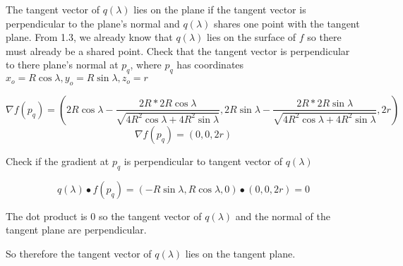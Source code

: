 \documentclass[a4paper,10pt]{scrartcl}
\begin{document}
The tangent vector of $q(\lambda)$ lies on the plane if the tangent vector is perpendicular to the plane's
normal and $q(\lambda)$ shares one point with the tangent plane. From 1.3, we already know that $q(\lambda)$ lies on
the surface of $f$ so there must already be a shared point. Check that the tangent vector is perpendicular to there
plane's normal at $p_q$, where $p_q$ has coordinates $x_o = R\cos\lambda, y_o = R\sin\lambda, z_o = r$

\[\nabla f(p_q) = (2R\cos\lambda - \frac{2R * 2R\cos\lambda}{\sqrt{4R^2\cos\lambda + 4R^2\sin\lambda}}, 2R\sin\lambda - \frac{2R * 2R\sin\lambda}{\sqrt{4R^2\cos\lambda + 4R^2\sin\lambda}}, 2r)\]
\[\nabla f(p_q) = (0, 0, 2r)\]

Check if the gradient at $p_q$ is perpendicular to tangent vector of $q(\lambda)$

\[q(\lambda) \bullet f(p_q) = (-R\sin\lambda, R\cos\lambda, 0) \bullet (0, 0, 2r) = 0\]

The dot product is $0$ so the tangent vector of $q(\lambda)$ and the normal of the tangent plane are perpendicular.

So therefore the tangent vector of $q(\lambda)$ lies on the tangent plane.
\end{document}

